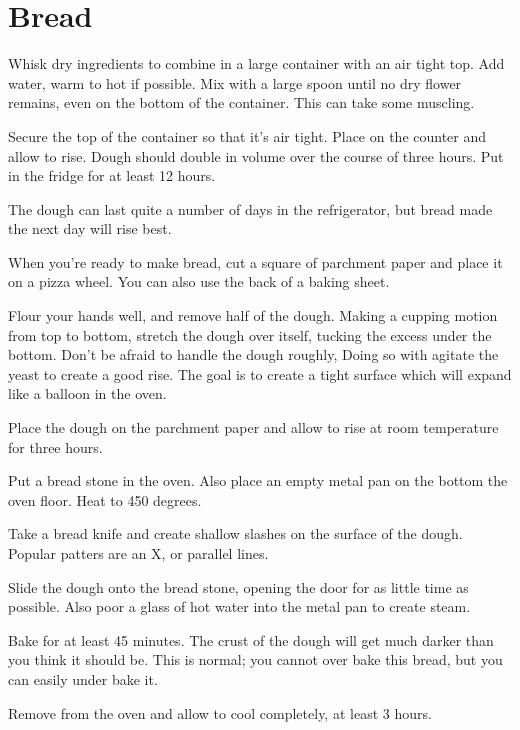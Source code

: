 
\section{Bread}
\begin{recipe}



Whisk dry ingredients to combine in a large container with an air tight top. Add water, warm to hot if possible. Mix with a large spoon until no dry flower remains, even on the bottom of the container. This can take some muscling.

Secure the top of the container so that it's air tight. Place on the counter and allow to rise. Dough should double in volume over the course of three hours. Put in the fridge for at least 12 hours.

The dough can last quite a number of days in the refrigerator, but bread made the next day will rise best.

When you're ready to make bread, cut a square of parchment paper and place it on a pizza wheel. You can also use the back of a baking sheet.

Flour your hands well, and remove half of the dough. Making a cupping motion from top to bottom, stretch the dough over itself, tucking the excess under the bottom. Don't be afraid to handle the dough roughly, Doing so with agitate the yeast to create a good rise. The goal is to create a tight surface which will expand like a balloon in the oven.

Place the dough on the parchment paper and allow to rise at room temperature for three hours.

Put a bread stone in the oven. Also place an empty metal pan on the bottom the oven floor. Heat to 450 degrees.

Take a bread knife and create shallow slashes on the surface of the dough. Popular patters are an X, or parallel lines.

Slide the dough onto the bread stone, opening the door for as little time as possible. Also poor a glass of hot water into the metal pan to create steam.

Bake for at least 45 minutes. The crust of the dough will get much darker than you think it should be. This is normal; you cannot over bake this bread, but you can easily under bake it.

Remove from the oven and allow to cool completely, at least 3 hours.

\end{recipe}
